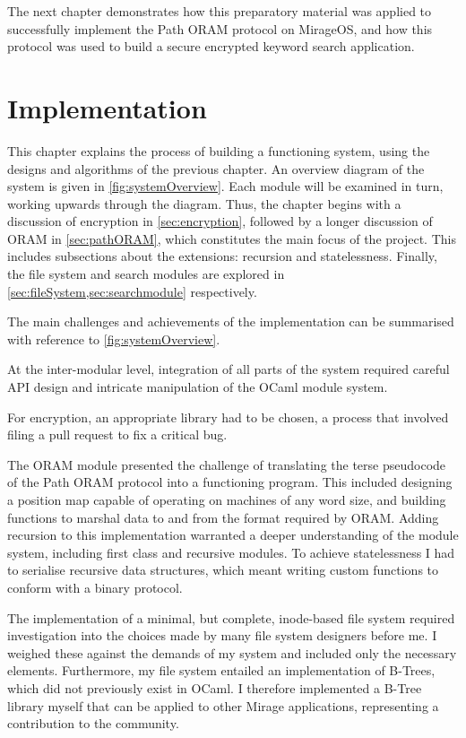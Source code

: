 \documentclass[12pt,a4paper,twoside,openright]{report}
\begin{document}
The next chapter demonstrates how this preparatory material was applied to successfully implement the Path ORAM protocol on MirageOS, and how this protocol was used to build a secure encrypted keyword search application.

\chapter{Implementation}

This chapter explains the process of building a functioning system, using the designs and algorithms of the previous chapter. An overview diagram of the system is given in \cref{fig:systemOverview}. Each module will be examined in turn, working upwards through the diagram. Thus, the chapter begins with a discussion of encryption in \cref{sec:encryption}, followed by a longer discussion of ORAM in \cref{sec:pathORAM}, which constitutes the main focus of the project. This includes subsections about the extensions: recursion and statelessness. Finally, the file system and search modules are explored in \cref{sec:fileSystem,sec:searchmodule} respectively.

The main challenges and achievements of the implementation can be summarised with reference to \cref{fig:systemOverview}.

At the inter-modular level, integration of all parts of the system required careful API design and intricate manipulation of the OCaml module system.

For encryption, an appropriate library had to be chosen, a process that involved filing a pull request to fix a critical bug.

The ORAM module presented the challenge of translating the terse pseudocode of the Path ORAM protocol into a functioning program. This included designing a position map capable of operating on machines of any word size, and building functions to marshal data to and from the format required by ORAM. Adding recursion to this implementation warranted a deeper understanding of the module system, including first class and recursive modules. To achieve statelessness I had to serialise recursive data structures, which meant writing custom functions to conform with a binary protocol.

The implementation of a minimal, but complete, inode-based file system required investigation into the choices made by many file system designers before me. I weighed these against the demands of my system and included only the necessary elements. Furthermore, my file system entailed an implementation of B-Trees, which did not previously exist in OCaml. I therefore implemented a B-Tree library myself that can be applied to other Mirage applications, representing a contribution to the community.
\end{document}
